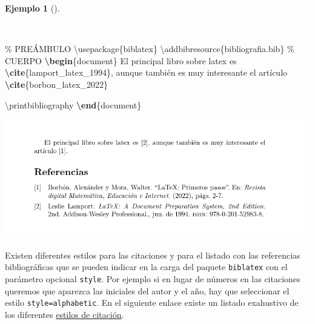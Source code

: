 \documentclass[
  a4paper,
]{scrreport}
\newenvironment{Shaded}{\begin{snugshade}}{\end{snugshade}}
\newcommand{\BuiltInTok}[1]{\textcolor[rgb]{0.00,0.23,0.31}{#1}}
\newcommand{\CommentTok}[1]{\textcolor[rgb]{0.37,0.37,0.37}{#1}}
\newcommand{\ExtensionTok}[1]{\textcolor[rgb]{0.00,0.23,0.31}{#1}}
\newcommand{\FunctionTok}[1]{\textcolor[rgb]{0.28,0.35,0.67}{#1}}
\newcommand{\KeywordTok}[1]{\textcolor[rgb]{0.00,0.23,0.31}{\textbf{#1}}}
\newcommand{\NormalTok}[1]{\textcolor[rgb]{0.00,0.23,0.31}{#1}}
\theoremstyle{definition}
\newtheorem{example}{Ejemplo}[chapter]
\theoremstyle{remark}
\begin{document}
\begin{example}[]\protect\hypertarget{exm-referencias-bibliograficas}{}\label{exm-referencias-bibliograficas}

~

\begin{Shaded}
\begin{Highlighting}[]
\CommentTok{\% PREÁMBULO}
\BuiltInTok{\textbackslash{}usepackage}\NormalTok{\{}\ExtensionTok{biblatex}\NormalTok{\}}
\FunctionTok{\textbackslash{}addbibresource}\NormalTok{\{bibliografia.bib\}}
\CommentTok{\% CUERPO}
\KeywordTok{\textbackslash{}begin}\NormalTok{\{}\ExtensionTok{document}\NormalTok{\}}
\NormalTok{El principal libro sobre latex es }\KeywordTok{\textbackslash{}cite}\NormalTok{\{}\ExtensionTok{lamport\_latex\_1994}\NormalTok{\}, aunque también }
\NormalTok{es muy interesante el artículo }\KeywordTok{\textbackslash{}cite}\NormalTok{\{}\ExtensionTok{borbon\_latex\_2022}\NormalTok{\}}

\FunctionTok{\textbackslash{}printbibliography}
\KeywordTok{\textbackslash{}end}\NormalTok{\{}\ExtensionTok{document}\NormalTok{\}}
\end{Highlighting}
\end{Shaded}

\begin{tcolorbox}[enhanced jigsaw, colframe=quarto-callout-note-color-frame, opacityback=0, title={Salida}, bottomrule=.15mm, left=2mm, coltitle=black, arc=.35mm, leftrule=.75mm, colback=white, rightrule=.15mm, colbacktitle=quarto-callout-note-color!10!white, toprule=.15mm, breakable, opacitybacktitle=0.6, bottomtitle=1mm, toptitle=1mm, titlerule=0mm]

\includegraphics{img/bibliografia/bibliografia.png}

\end{tcolorbox}

\end{example}

Existen diferentes estilos para las citaciones y para el listado con las
referencias bibliográficas que se pueden indicar en la carga del paquete
\texttt{biblatex} con el parámetro opcional \texttt{style}. Por ejemplo
si en lugar de números en las citaciones queremos que aparezca las
iniciales del autor y el año, hay que seleccionar el estilo
\texttt{style=alphabetic}. En el siguiente enlace existe un listado
exahustivo de los diferentes
\href{https://www.overleaf.com/learn/latex/Biblatex_citation_styles}{estilos
de citación}.
\end{document}
